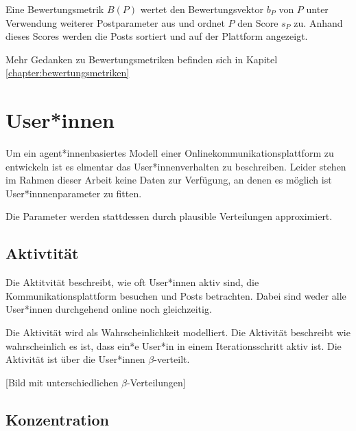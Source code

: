 Eine Bewertungsmetrik $B(P)$ wertet den Bewertungsvektor $b_P$ von $P$ unter Verwendung weiterer Postparameter aus und ordnet $P$ den Score $s_P$ zu. Anhand dieses Scores werden die Posts sortiert und auf der Plattform angezeigt. 

Mehr Gedanken zu Bewertungsmetriken befinden sich in Kapitel \ref{chapter:bewertungsmetriken}

\section{User*innen}

Um ein agent*innenbasiertes Modell einer Onlinekommunikationsplattform zu entwickeln ist es elmentar das User*innenverhalten zu beschreiben. Leider stehen im Rahmen dieser Arbeit keine Daten zur Verfügung, an denen es möglich ist User*innnenparameter zu fitten.

Die Parameter werden stattdessen durch plausible Verteilungen approximiert.

\subsection{Aktivtität}


Die Aktitvität beschreibt, wie oft User*innen aktiv sind, die Kommunikationsplattform besuchen und Posts betrachten. Dabei sind weder alle User*innen durchgehend online noch gleichzeitig. 

Die Aktivität wird als Wahrscheinlichkeit modelliert. Die Aktivität beschreibt wie wahrscheinlich es ist, dass ein*e User*in in einem Iterationsschritt aktiv ist. Die Aktivität ist über die User*innen $\beta$-verteilt.


[Bild mit unterschiedlichen $\beta$-Verteilungen]

\subsection{Konzentration}

